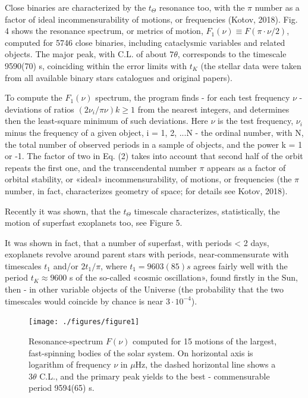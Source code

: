 \documentclass[twoside,draft]{article}
\begin{document}
\begin{sloppypar}
{Close binaries are characterized by the $t_{\Theta}$ resonance too, with the $\pi$ number as a factor of ideal
incommensurability of motions, or frequencies (Kotov, 2018). Fig. 4 shows the resonance spectrum,
or metrics of motion, $F_{1} (\nu) \equiv F(\pi \cdot \nu/2)$, computed for 5746 close binaries, including cataclysmic
variables and related objects. The major peak, with C.L. of about $7 \theta$, corresponds to the timescale
9590(70) s, coinciding within the error limits with $t_{K}$ (the stellar data were taken from all available
binary stars catalogues and original papers).

To compute the $F_{1} (\nu)$ spectrum, the program finds - for each test frequency $\nu$ - deviations of
ratios $(2\nu_{i} /\pi \nu) k \geq 1$ from the nearest integers, and determines then the least-square minimum of such
deviations. Here $\nu$ is the test frequency, $\nu_{i}$ minus the frequency of a given object, i = 1, 2, ...N - the
ordinal number, with N, the total number of observed periods in a sample of objects, and the power
k = 1 or -1. The factor of two in Eq. (2) takes into account that second half of the orbit repeats the
first one, and the transcendental number $\pi$ appears as a factor of orbital stability, or «ideal»
incommensurability, of motions, or frequencies (the $\pi$ number, in fact, characterizes geometry of
space; for details see Kotov, 2018).

Recently it was shown, that the $t_{\Theta}$ timescale characterizes, statistically, the motion of superfast
exoplanets too, see Figure 5.

It was shown in fact, that a number of superfast, with periods < 2 days, exoplanets revolve
around parent stars with periods, near-commensurate with timescales $t_{1}$ and/or $2 t_{1}/\pi$, where $t_{1} =
9603(85) s$ agrees fairly well with the period $t_{K} \approx 9600$ s of the so-called «cosmic oscillation», found
firstly in the Sun, then - in other variable objects of the Universe (the probability that the two
timescales would coincide by chance is near $3 \cdot 10^{-4}$).

\begin{figure}
\centering
\texttt{[image: ./figures/figure1]}
\caption{Resonance-spectrum $F(\nu)$ computed for 15 motions of the largest, fast-spinning bodies of
the solar system. On horizontal axis is logarithm of frequency $\nu$ in $\mu$Hz, the dashed horizontal line
shows a $ 3 \theta $ C.L., and the primary peak yields to the best - commensurable period 9594(65) s.}
\label{fig:figure_label}
\end{figure}

}
\end{sloppypar}
\end{document}
